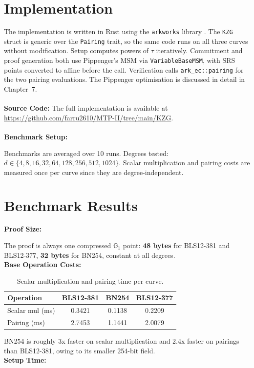 \section{Implementation}

The implementation is written in Rust using the \texttt{arkworks}
library \cite{arkworks}. The \texttt{KZG} struct is generic over
the \texttt{Pairing} trait, so the same code runs on all three
curves without modification. Setup computes powers of $\tau$
iteratively. Commitment and proof generation both use Pippenger's
MSM via \texttt{VariableBaseMSM}, with SRS points converted to
affine before the call. Verification calls \texttt{ark\_ec::pairing}
for the two pairing evaluations. The Pippenger optimisation is
discussed in detail in Chapter~7.
\\\\
\textbf{Source Code:}
The full implementation is available at
\url{https://github.com/farru2610/MTP-II/tree/main/KZG}.
\\\\
\textbf{Benchmark Setup:}

Benchmarks are averaged over 10 runs. Degrees tested:
$d \in \{4, 8, 16, 32, 64, 128, 256, 512, 1024\}$.
Scalar multiplication and pairing costs are measured once per curve
since they are degree-independent.

\section{Benchmark Results}

\textbf{Proof Size:}

The proof is always one compressed $\mathbb{G}_1$ point:
\textbf{48 bytes} for BLS12-381 and BLS12-377, \textbf{32 bytes}
for BN254, constant at all degrees.
\\
\textbf{Base Operation Costs:}
\begin{table}[H]
\centering
\caption{Scalar multiplication and pairing time per curve.}
\label{tab:kzg-base-ops}
\begin{tabular}{lccc}
\toprule
\textbf{Operation} & \textbf{BLS12-381} & \textbf{BN254} & \textbf{BLS12-377} \\
\midrule
Scalar mul (ms) & 0.3421 & 0.1138 & 0.2209 \\
Pairing (ms)    & 2.7453 & 1.1441 & 2.0079 \\
\bottomrule
\end{tabular}
\end{table}

BN254 is roughly 3x faster on scalar multiplication and 2.4x faster
on pairings than BLS12-381, owing to its smaller 254-bit field.
\\
\textbf{Setup Time:}


